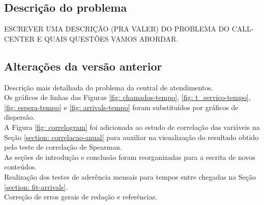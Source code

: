 \subsection{Descrição do problema}
ESCREVER UMA DESCRIÇÃO (PRA VALER) DO PROBLEMA DO CALL-CENTER E QUAIS QUESTÕES VAMOS ABORDAR.

\subsection{Alterações da versão anterior}
Descrição mais detalhada do problema da central de atendimentos.\\
Os gráficos de linhas das Figuras \ref*{fig: chamados-tempo}, \ref*{fig: t_servico-tempo}, \ref*{fig: espera-tempo} e \ref*{fig: arrivals-tempo} foram substituídos por gráficos de dispersão.\\
A Figura \ref*{fig: correlogram} foi adicionada ao estudo de correlação das variáveis na Seção \ref*{section: correlacao-anual} para auxiliar na visualização do resultado obtido pelo teste de correlação de Spearman.\\
As seções de introdução e conclusão foram reorganizadas para a escrita de novos conteúdos.\\
Realização dos testes de aderência mensais para tempos entre chegadas na Seção \ref*{section: fit-arrivals}.\\
Correção de erros gerais de redação e referências.

